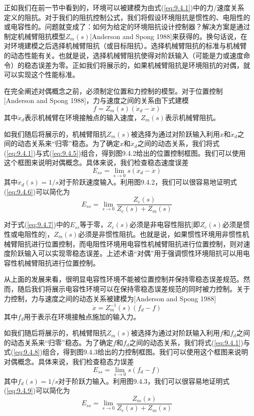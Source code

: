 \documentclass[12pt,a4paper]{ctexart}
\begin{document}
正如我们在前一节中看到的，环境可以被建模为由式(\ref{eq:9.4.1})中的力/速度关系定义的阻抗。对于我们的阻抗控制公式，我们将假设环境阻抗是惯性的、电阻性的或电容性的。问题就变成了：如何为给定的环境阻抗设计控制器？解决方案是通过制定机械臂阻抗模型$Z_m(s)$[Anderson and Spong 1988]来获得的。换句话说，在对环境建模之后选择机械臂阻抗（或目标阻抗）。选择机械臂阻抗的标准与机械臂的动态性能有关。也就是说，选择机械臂阻抗使得对阶跃输入（可能是力或速度命令）的稳态误差为零。正如我们将展示的，如果机械臂阻抗是环境阻抗的对偶，就可以实现这个性能标准。

在完全阐述对偶概念之前，必须制定位置和力控制的模型。对于位置控制[Anderson and Spong 1988]，力与速度之间的关系由下式建模
\begin{equation}\label{eq:9.4.5}
f = Z_m(s)(\dot{x}_d - \dot{x})
\end{equation}
其中$\dot{x}_d$表示机械臂在环境接触点的输入速度，$Z_m(s)$表示机械臂阻抗。

如我们随后将展示的，机械臂阻抗$Z_m(s)$被选择为通过对阶跃输入利用$x$和$\dot{x}_d$之间的动态关系来``归零''稳态。为了确定$x$和$\dot{x}_d$之间的动态关系，我们将式(\ref{eq:9.4.1})与式(\ref{eq:9.4.5})组合，得到图9.4.2给出的位置控制框图。我们可以使用这个框图来说明对偶概念。具体来说，我们检查稳态速度误差
\begin{equation}\label{eq:9.4.6}
E_{ss} = \lim_{s \to 0} s(\dot{x}_d - \dot{x})
\end{equation}
其中$\dot{x}_d(s) = 1/s$对于阶跃速度输入。利用图9.4.2，我们可以很容易地证明式(\ref{eq:9.4.6})可以简化为
\begin{equation}\label{eq:9.4.7}
E_{ss} = \lim_{s \to 0} \frac{Z_e(s)}{Z_e(s) + Z_m(s)}
\end{equation}

对于式(\ref{eq:9.4.7})中的$E_{ss}$等于零，$Z_e(s)$必须是非电容性阻抗[即$Z_e(s)$必须是惯性或电阻性的]，$Z_m(s)$必须是非惯性阻抗。也就是说，如果惯性环境用非惯性机械臂阻抗进行位置控制，而电阻性环境用电容性机械臂阻抗进行位置控制，则对速度阶跃输入可以实现零稳态误差。上述术语``对偶''用于强调惯性环境阻抗可以用电容性机械臂阻抗进行位置控制。

从上面的发展来看，很明显电容性环境不能被位置控制并保持零稳态误差规范。然而，随后我们将展示电容性环境可以在保持零稳态误差规范的同时被力控制。关于力控制，力与速度之间的动态关系被建模为[Anderson and Spong 1988]
\begin{equation}\label{eq:9.4.8}
\dot{x} = Z_m^{-1}(s)(f_d - f)
\end{equation}
其中$f_d$用于表示在环境接触点施加的输入力。

如我们随后将展示的，机械臂阻抗$Z_m(s)$被选择为通过对阶跃输入利用$f$和$f_d$之间的动态关系来``归零''稳态。为了确定$f$和$f_d$之间的动态关系，我们将式(\ref{eq:9.4.1})与式(\ref{eq:9.4.8})组合，得到图9.4.3给出的力控制框图。我们可以使用这个框图来说明对偶概念。具体来说，我们检查稳态力误差
\begin{equation}\label{eq:9.4.9}
E_{ss} = \lim_{s \to 0} s(f_d - f)
\end{equation}
其中$f_d(s) = 1/s$对于阶跃力输入。利用图9.4.3，我们可以很容易地证明式(\ref{eq:9.4.9})可以简化为
\begin{equation}\label{eq:9.4.10}
E_{ss} = \lim_{s \to 0} \frac{Z_m(s)}{Z_e(s) + Z_m(s)}
\end{equation}
\end{document}
